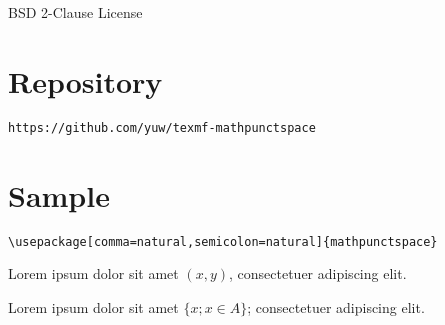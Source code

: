 \documentclass{article}
\begin{document}
BSD 2-Clause License

\section{Repository}

\texttt{https://github.com/yuw/texmf-mathpunctspace}

\section{Sample}

\begin{verbatim}
\usepackage[comma=natural,semicolon=natural]{mathpunctspace}
\end{verbatim}

Lorem ipsum dolor sit amet $(x, y)$, consectetuer adipiscing elit.

Lorem ipsum dolor sit amet $\{x; x \in A\}$; consectetuer adipiscing elit.
\end{document}
